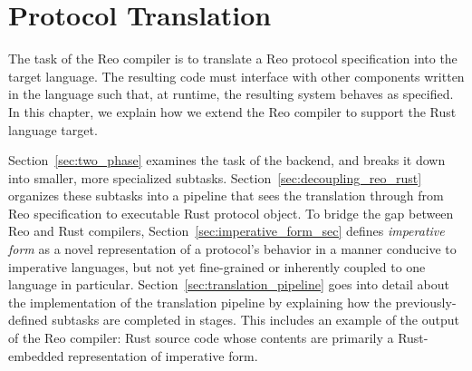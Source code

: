 \chapter{Protocol Translation}
\label{sec:imperative_form}

The task of the Reo compiler is to translate a Reo protocol specification into the target language. The resulting code must interface with other components written in the language such that, at runtime, the resulting system behaves as specified. In this chapter, we explain how we extend the Reo compiler to support the Rust language target.

Section~\ref{sec:two_phase} examines the task of the backend, and breaks it down into smaller, more specialized subtasks. Section~\ref{sec:decoupling_reo_rust} organizes these subtasks into a pipeline that sees the translation through from Reo specification to executable Rust protocol object. To bridge the gap between Reo and Rust compilers, Section~\ref{sec:imperative_form_sec} defines \textit{imperative form} as a novel representation of a protocol's behavior in a manner conducive to imperative languages, but not yet fine-grained or inherently coupled to one language in particular. Section~\ref{sec:translation_pipeline} goes into detail about the implementation of the translation pipeline by explaining how the previously-defined subtasks are completed in stages. This includes an example of the output of the Reo compiler: Rust source code whose contents are primarily a Rust-embedded representation of imperative form.


